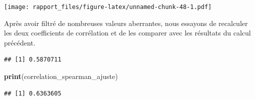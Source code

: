 \documentclass[
]{article}
\newenvironment{Shaded}{\begin{snugshade}}{\end{snugshade}}
\newcommand{\AttributeTok}[1]{\textcolor[rgb]{0.13,0.29,0.53}{#1}}
\newcommand{\DecValTok}[1]{\textcolor[rgb]{0.00,0.00,0.81}{#1}}
\newcommand{\FunctionTok}[1]{\textcolor[rgb]{0.13,0.29,0.53}{\textbf{#1}}}
\newcommand{\NormalTok}[1]{#1}
\newcommand{\OtherTok}[1]{\textcolor[rgb]{0.56,0.35,0.01}{#1}}
\newcommand{\SpecialCharTok}[1]{\textcolor[rgb]{0.81,0.36,0.00}{\textbf{#1}}}
\newcommand{\StringTok}[1]{\textcolor[rgb]{0.31,0.60,0.02}{#1}}
\begin{document}
\texttt{[image: rapport\_files/figure-latex/unnamed-chunk-48-1.pdf]}

Après avoir filtré de nombreuses valeurs aberrantes, nous essayons de
recalculer les deux coefficients de corrélation et de les comparer avec
les résultats du calcul précédent.

\begin{Shaded}
\end{Shaded}

\begin{verbatim}
## [1] 0.5870711
\end{verbatim}

\begin{Shaded}
\begin{Highlighting}[]
\FunctionTok{print}\NormalTok{(correlation\_spearman\_ajuste)}
\end{Highlighting}
\end{Shaded}

\begin{verbatim}
## [1] 0.6363605
\end{verbatim}
\end{document}
